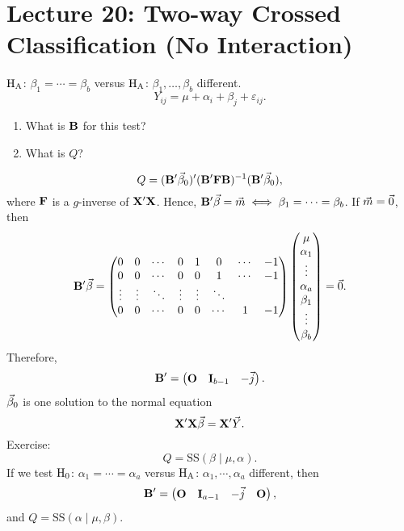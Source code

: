 \section{Lecture 20: Two-way Crossed Classification (No Interaction)}
$ \text{H}_{\text{A}} $: $ \beta_1=\cdots=\beta_b $ versus $ \text{H}_{\text{A}} $:
$ \beta_1,\ldots,\beta_b $ different.
\[ Y_{ij}=\mu+\alpha_i+\beta_j+\varepsilon_{ij}. \]
\begin{enumerate}[(1)]
    \item What is $ \mathbf{B} $ for this test?
    \item What is $ Q $?
\end{enumerate}
\[ Q=(\mathbf{B}'\vec{\beta}_0)'(\mathbf{B}'\mathbf{F}\mathbf{B})^{-1}(\mathbf{B}'\vec{\beta}_0), \]
where $ \mathbf{F} $ is a $ g $-inverse of $ \mathbf{X}'\mathbf{X} $.
Hence, $ \mathbf{B}'\vec{\beta}=\vec{m}\iff
    \beta_1=\cdots=\beta_b $. If $ \vec{m}=\vec{0} $, then
\[ \mathbf{B}'\vec{\beta}=\begin{pmatrix}
        0      & 0      & \cdots & 0      & 1      & 0      & \cdots & -1 \\
        0      & 0      & \cdots & 0      & 0      & 1      & \cdots & -1 \\
        \vdots & \vdots & \ddots & \vdots & \vdots & \ddots               \\
        0      & 0      & \cdots & 0      & 0      & \cdots & 1      & -1 \\
    \end{pmatrix}\begin{pmatrix}
        \mu      \\
        \alpha_1 \\
        \vdots   \\
        \alpha_a \\
        \beta_1  \\
        \vdots   \\
        \beta_b
    \end{pmatrix}=\vec{0}. \]
Therefore,
\[ \mathbf{B}'=\begin{pmatrix}
        \mathbf{O} & \mathbf{I}_{b-1} & -\vec{j}
    \end{pmatrix}. \]
$ \vec{\beta}_0 $ is one solution to the normal equation
\[ \mathbf{X}'\mathbf{X}\vec{\beta}=\mathbf{X}'\vec{Y}. \]
Exercise:
\[ Q=\text{SS}(\beta\mid \mu,\alpha). \]
If we test $ \text{H}_0 $: $ \alpha_1=\cdots=\alpha_a $
versus $ \text{H}_{\text{A}} $: $ \alpha_1,\cdots,\alpha_a $ different, then
\[ \mathbf{B}'=\begin{pmatrix}
        \mathbf{O} & \mathbf{I}_{a-1} & -\vec{j} & \mathbf{O}
    \end{pmatrix}, \]
and $ Q=\text{SS}(\alpha\mid \mu,\beta) $.

